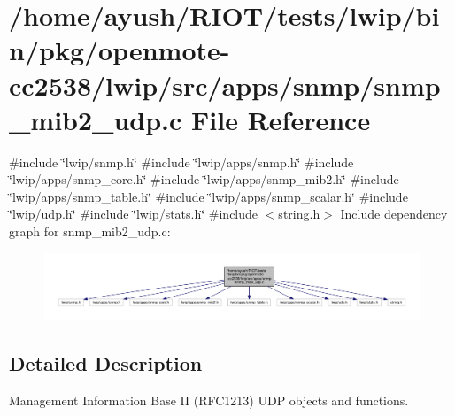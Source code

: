 \hypertarget{openmote-cc2538_2lwip_2src_2apps_2snmp_2snmp__mib2__udp_8c}{}\section{/home/ayush/\+R\+I\+O\+T/tests/lwip/bin/pkg/openmote-\/cc2538/lwip/src/apps/snmp/snmp\+\_\+mib2\+\_\+udp.c File Reference}
\label{openmote-cc2538_2lwip_2src_2apps_2snmp_2snmp__mib2__udp_8c}
{\ttfamily \#include \char`\"{}lwip/snmp.\+h\char`\"{}}\newline
{\ttfamily \#include \char`\"{}lwip/apps/snmp.\+h\char`\"{}}\newline
{\ttfamily \#include \char`\"{}lwip/apps/snmp\+\_\+core.\+h\char`\"{}}\newline
{\ttfamily \#include \char`\"{}lwip/apps/snmp\+\_\+mib2.\+h\char`\"{}}\newline
{\ttfamily \#include \char`\"{}lwip/apps/snmp\+\_\+table.\+h\char`\"{}}\newline
{\ttfamily \#include \char`\"{}lwip/apps/snmp\+\_\+scalar.\+h\char`\"{}}\newline
{\ttfamily \#include \char`\"{}lwip/udp.\+h\char`\"{}}\newline
{\ttfamily \#include \char`\"{}lwip/stats.\+h\char`\"{}}\newline
{\ttfamily \#include $<$string.\+h$>$}\newline
Include dependency graph for snmp\+\_\+mib2\+\_\+udp.\+c\+:
\nopagebreak
\begin{figure}[H]
\begin{center}
\leavevmode
\includegraphics[width=350pt]{openmote-cc2538_2lwip_2src_2apps_2snmp_2snmp__mib2__udp_8c__incl}
\end{center}
\end{figure}


\subsection{Detailed Description}
Management Information Base II (R\+F\+C1213) U\+DP objects and functions. 